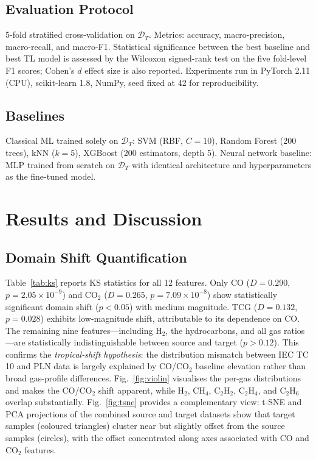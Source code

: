 \documentclass[conference]{IEEEtran}
\begin{document}
\subsection{Evaluation Protocol}
5-fold stratified cross-validation on $\mathcal{D}_T$.
Metrics: accuracy, macro-precision, macro-recall, and macro-F1.
Statistical significance between the best baseline and best TL model
is assessed by the Wilcoxon signed-rank test on the five fold-level
F1 scores; Cohen's $d$ effect size is also reported.
Experiments run in PyTorch 2.11 (CPU), scikit-learn 1.8, NumPy, seed
fixed at 42 for reproducibility.

\subsection{Baselines}
Classical ML trained solely on $\mathcal{D}_T$:
SVM (RBF, $C=10$), Random Forest (200 trees), kNN ($k=5$),
XGBoost (200 estimators, depth 5).
Neural network baseline: MLP trained from scratch on $\mathcal{D}_T$
with identical architecture and hyperparameters as the fine-tuned model.

\section{Results and Discussion}
\label{sec:results}

\subsection{Domain Shift Quantification}
Table~\ref{tab:ks} reports KS statistics for all 12 features.
Only CO ($D=0.290$, $p=2.05\times10^{-9}$) and
CO$_2$ ($D=0.265$, $p=7.09\times10^{-8}$) show statistically
significant domain shift ($p < 0.05$) with medium magnitude.
TCG ($D=0.132$, $p=0.028$) exhibits low-magnitude shift,
attributable to its dependence on CO.
The remaining nine features---including H$_2$, the hydrocarbons,
and all gas ratios---are statistically indistinguishable between
source and target ($p > 0.12$).
This confirms the \emph{tropical-shift hypothesis}: the distribution
mismatch between IEC TC\,10 and PLN data is largely explained
by CO/CO$_2$ baseline elevation rather than broad gas-profile differences.
Fig.~\ref{fig:violin} visualises the per-gas distributions and
makes the CO/CO$_2$ shift apparent, while H$_2$, CH$_4$, C$_2$H$_2$,
C$_2$H$_4$, and C$_2$H$_6$ overlap substantially.
Fig.~\ref{fig:tsne} provides a complementary view: t-SNE and PCA
projections of the combined source and target datasets show that
target samples (coloured triangles) cluster near but slightly offset
from the source samples (circles), with the offset concentrated
along axes associated with CO and CO$_2$ features.
\end{document}
